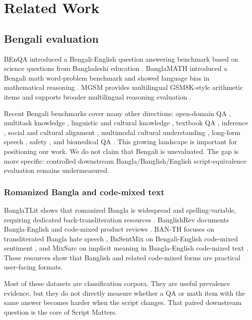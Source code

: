 \chapter{Related Work}

\section{Bengali evaluation}

BEnQA introduced a Bengali-English question answering benchmark based on science questions from Bangladeshi education \cite{shafayat-etal-2024-benqa}. BanglaMATH introduced a Bengali math word-problem benchmark and showed language bias in mathematical reasoning \cite{banglamath2025}. MGSM provides multilingual GSM8K-style arithmetic items and supports broader multilingual reasoning evaluation \cite{mgsm2022,gsm8k2021}.

Recent Bengali benchmarks cover many other directions: open-domain QA \cite{banglaquad2024}, multitask knowledge \cite{bnmmlu2025}, linguistic and cultural knowledge \cite{bluck2025}, textbook QA \cite{nctbqa2026}, inference \cite{bnli2025}, social and cultural alignment \cite{banglasocialbench2026}, multimodal cultural understanding \cite{banglaverse2026}, long-form speech \cite{bengaliloop2026}, safety \cite{banglaguard2026}, and biomedical QA \cite{banglamedqa2025}. This growing landscape is important for positioning our work. We do not claim that Bengali is unevaluated. The gap is more specific: controlled downstream Bangla/Banglish/English script-equivalence evaluation remains undermeasured.

\subsection{Romanized Bangla and code-mixed text}

BanglaTLit shows that romanized Bangla is widespread and spelling-variable, requiring dedicated back-transliteration resources \cite{fahim-etal-2024-banglatlit}. BanglishRev documents Bangla-English and code-mixed product reviews \cite{banglishrev2024}. BAN-TH focuses on transliterated Bangla hate speech \cite{banth2024}, BnSentMix on Bengali-English code-mixed sentiment \cite{bnsentmix2024}, and MixSarc on implicit meaning in Bangla-English code-mixed text \cite{mixsarc2026}. These resources show that Banglish and related code-mixed forms are practical user-facing formats.

Most of these datasets are classification corpora. They are useful prevalence evidence, but they do not directly measure whether a QA or math item with the same answer becomes harder when the script changes. That paired downstream question is the core of Script Matters.

